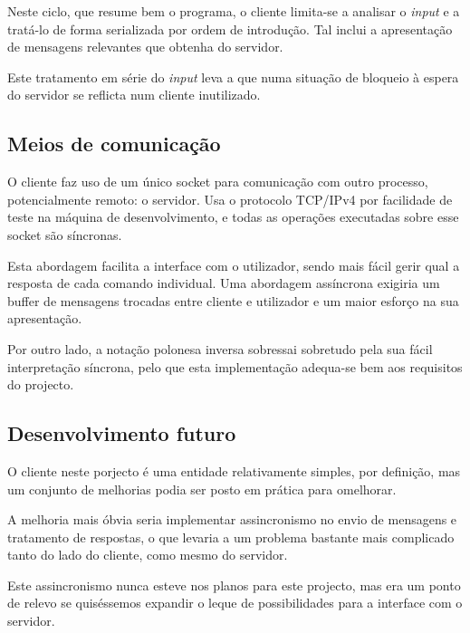 	Neste ciclo, que resume bem o programa, o cliente limita-se a analisar o \emph{input} e a tratá-lo de forma serializada por ordem de introdução.
	Tal inclui a apresentação de mensagens relevantes que obtenha do servidor.
	
	Este tratamento em série do \emph{input} leva a que numa situação de bloqueio à espera do servidor se reflicta num cliente inutilizado.
		

\clearpage
\subsection{Meios de comunicação\label{sec:cliente_comunicacao}}

	\indent\indent O cliente faz uso de um único socket para comunicação com outro processo, potencialmente remoto: o servidor.
	Usa o protocolo TCP/IPv4 por facilidade de teste na máquina de desenvolvimento, e todas as operações executadas sobre esse socket são síncronas.
	
	Esta abordagem facilita a interface com o utilizador, sendo mais fácil gerir qual a resposta de cada comando individual.
	Uma abordagem assíncrona exigiria um buffer de mensagens trocadas entre cliente e utilizador e um maior esforço na sua apresentação.
	
	Por outro lado, a notação polonesa inversa sobressai sobretudo pela sua fácil interpretação síncrona, pelo que esta implementação adequa-se bem aos requisitos do projecto.
	
	
\clearpage
\subsection{Desenvolvimento futuro\label{sec:cliente_desenvolvimento}}

	\indent\indent O cliente neste porjecto é uma entidade relativamente simples, por definição, mas um conjunto de melhorias podia ser posto em prática para omelhorar.
	
	A melhoria mais óbvia seria implementar assincronismo no envio de mensagens e tratamento de respostas, o que levaria a um problema bastante mais complicado tanto do lado do cliente, como mesmo do servidor.
	
	Este assincronismo nunca esteve nos planos para este projecto, mas era um ponto de relevo se quiséssemos expandir o leque de possibilidades para a interface com o servidor.


\clearpage
